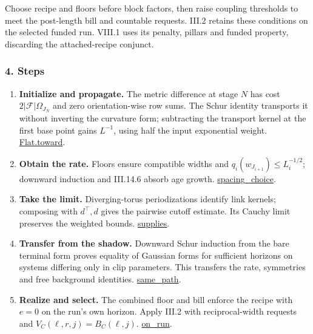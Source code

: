 \documentclass[
  letterpaper,
  11pt]{article}
\providecommand{\tightlist}{%
  \setlength{\itemsep}{0pt}\setlength{\parskip}{0pt}}
\begin{document}
Choose recipe and floors before block factors, then raise coupling
thresholds to meet the post-length bill and countable requests. III.2
retains these conditions on the selected funded run. VIII.1 uses its
penalty, pillars and funded property, discarding the attached-recipe
conjunct.

\subsubsection{4. Steps}\label{steps-16}

\begin{enumerate}
\def\labelenumi{\arabic{enumi}.}
\tightlist
\item
  \textbf{Initialize and propagate.} The metric difference at stage
  \(N\) has cost \(2|\mathcal F|\Omega_{J_N}\) and zero orientation-wise
  row sums. The Schur identity transports it without inverting the
  curvature form; subtracting the transport kernel at the first base
  point gains \(L^{-1}\), using half the input exponential weight.
  \href{https://github.com/yang-mills-group/OpenAI-YM-20261028/blob/3456e5e75cf8d4cd558955a5c7638fba2d68f464/YM/RG08/Packets/FlatStep.lean\#L50-L78}{Flat.toward}.
\item
  \textbf{Obtain the rate.} Floors ensure compatible widths and
  \(q_i(w_{J_{i+1}})\le L_i^{-1/2}\); downward induction and III.14.6
  absorb age growth.
  \href{https://github.com/yang-mills-group/OpenAI-YM-20261028/blob/3456e5e75cf8d4cd558955a5c7638fba2d68f464/YM/RG08/Flat/Length.lean\#L64-L92}{spacing\_choice}.
\item
  \textbf{Take the limit.} Diverging-torus periodizations identify link
  kernels; composing with \(d^\top,d\) gives the pairwise cutoff
  estimate. Its Cauchy limit preserves the weighted bounds.
  \href{https://github.com/yang-mills-group/OpenAI-YM-20261028/blob/3456e5e75cf8d4cd558955a5c7638fba2d68f464/YM/RG08/Flat/Mesh.lean\#L107-L164}{supplies}.
\item
  \textbf{Transfer from the shadow.} Downward Schur induction from the
  bare terminal form proves equality of Gaussian forms for sufficient
  horizons on systems differing only in clip parameters. This transfers
  the rate, symmetries and free background identities.
  \href{https://github.com/yang-mills-group/OpenAI-YM-20261028/blob/3456e5e75cf8d4cd558955a5c7638fba2d68f464/YM/RG08/Flat/Agreement.lean\#L23-L36}{same\_path}.
\item
  \textbf{Realize and select.} The combined floor and bill enforce the
  recipe with \(e=0\) on the run's own horizon. Apply III.2 with
  reciprocal-width requests and \(V_C(\ell,r,j)=B_C(\ell,j)\).
  \href{https://github.com/yang-mills-group/OpenAI-YM-20261028/blob/3456e5e75cf8d4cd558955a5c7638fba2d68f464/YM/Integration/ActualRunNativeComponentRecipe.lean\#L25-L54}{on\_run}.
\end{enumerate}
\end{document}
